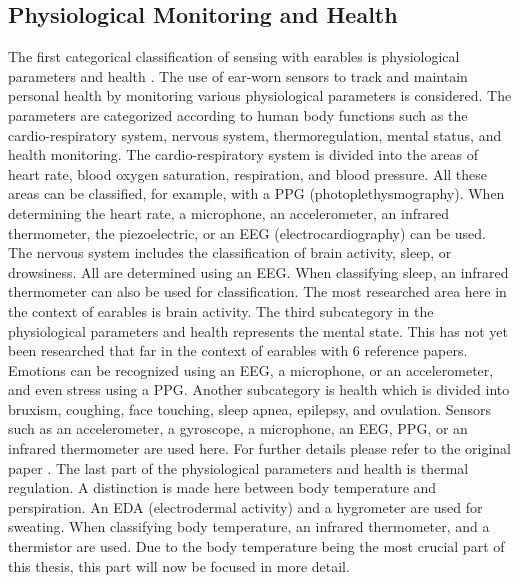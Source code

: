 \subsection{Physiological Monitoring and Health}
\label{Background:SensingWithEarables:Physiological}
The first categorical classification of sensing with earables is physiological parameters and health \cite{roddigerSensingEarablesSystematic2022a}.
The use of ear-worn sensors to track and maintain personal health by monitoring various physiological parameters is considered.
The parameters are categorized according to human body functions such as the cardio-respiratory system, nervous system, thermoregulation, mental status, and health monitoring.
The cardio-respiratory system is divided into the areas of heart rate, blood oxygen saturation, respiration, and blood pressure.
All these areas can be classified, for example, with a PPG (photoplethysmography). 
When determining the heart rate, a microphone, an accelerometer, an infrared thermometer, the piezoelectric, or an EEG (electrocardiography) can be used.
The nervous system includes the classification of brain activity, sleep, or drowsiness. 
All are determined using an EEG. When classifying sleep, an infrared thermometer can also be used for classification. 
The most researched area here in the context of earables is brain activity.
The third subcategory in the physiological parameters and health represents the mental state.
This has not yet been researched that far in the context of earables with 6 reference papers.
Emotions can be recognized using an EEG, a microphone, or an accelerometer, and even stress using a PPG.
Another subcategory is health which is divided into bruxism, coughing, face touching, sleep apnea, epilepsy, and ovulation.
Sensors such as an accelerometer, a gyroscope, a microphone, an EEG, PPG, or an infrared thermometer are used here.
For further details please refer to the original paper \cite{roddigerSensingEarablesSystematic2022a}.
The last part of the physiological parameters and health is thermal regulation. A distinction is made here between body temperature and perspiration. An EDA (electrodermal activity) and a hygrometer are used for sweating.
When classifying body temperature, an infrared thermometer, and a thermistor are used.
Due to the body temperature being the most crucial part of this thesis, this part will now be focused in more detail.

